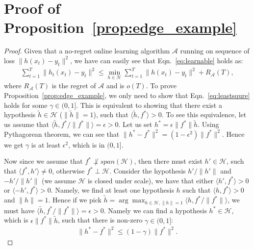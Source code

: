 \section{Proof of Proposition~\ref{prop:edge_example}}
\begin{proof}
Given that a no-regret online learning algorithm $\mathcal{A}$ running on sequence of loss $\|h(x_t) - y_t\|^2$, we have can easily see that Eqn.~\ref{eq:learnable} holds as:
\begin{align}
\sum_{t=1}^T\|h_t(x_t) - y_t\|^2\leq \min_{h\in\mathcal{H}}\sum_{t=1}^T\|h(x_t) - y_t\|^2 + R_{\mathcal{A}}(T), 
\end{align}where $R_{\mathcal{A}}(T)$ is the regret of $\mathcal{A}$ and is $o(T)$. To prove Proposition~\ref{prop:edge_example}, we only need to show that Eqn.~\ref{eq:leastsqure} holds for some $\gamma\in(0,1]$. This is equivalent to showing that there exist a hypothesis $\tilde{h}\in\mathcal{H}$ ($\|\tilde{h}\| = 1$), such that $\langle \tilde{h}, f^* \rangle > 0$. To see this equivalence, let us assume that $\langle \tilde{h}, f^*/\|f^*\| \rangle = \epsilon > 0$. Let us set $h^* = \epsilon\|f^*\| \tilde{h}$. Using Pythagorean theorem, we can see that $\| h^* - f^* \|^2 = (1-\epsilon^2)\|f^*\|^2$. Hence we get $\gamma$ is at least $\epsilon^2$, which is in $(0,1]$. 


Now since we assume that $f^*\not\perp span(\mathcal{H})$, then there must exist ${h}'\in \mathcal{H}$, such that $\langle f^*, h'\rangle\neq 0$, otherwise $f^*\perp\mathcal{H}$. Consider the hypothesis $h'/\|h'\|$ and $-h'/\|h'\|$ (we assume $\mathcal{H}$ is closed under scale), we have that either $\langle h', f^*\rangle >0$ or $\langle -h', f^* \rangle >0$. Namely, we find at least one hypothesis $h$ such that $\langle h, f^*\rangle >0$ and $\|h\| = 1$.  Hence if we pick $\tilde{h} = \arg\max_{h\in\mathcal{H}, \|h\|=1} \langle h, f^*/\|f^*\| \rangle$, we must have $\langle  \tilde{h}, f^*/\|f^*\|\rangle = \epsilon >0$. Namely we can find a hypothesis $h^*\in\mathcal{H}$, which is $\epsilon\|f^*\|\tilde{h}$, such that there is non-zero $\gamma\in(0,1]$:
\begin{align}
\|h^* - f^* \|^2\leq (1-\gamma)\|f^*\|^2.
\end{align}







\end{proof}
